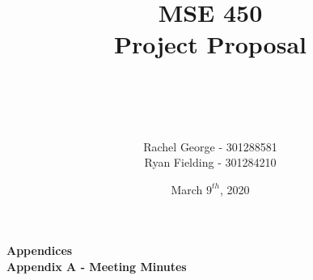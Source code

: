 \documentclass[12pt]{article}
\title{\textbf{MSE 450\\Project Proposal}}
\author{\\ \\ \\ \\ Rachel George -  301288581 \\ Ryan Fielding - 301284210}
\date{March $9^{th}$, 2020}
\begin{document}
\maketitle

\newpage


\nocite{*}



{\Large \textbf{Appendices\\}}\newline
{\large \textbf{Appendix A - Meeting Minutes\\}} 

% 
\end{document}
